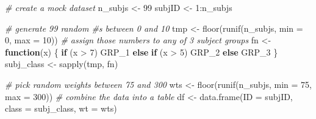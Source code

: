 \documentclass[smallextended]{svjour3}       %
\newenvironment{Shaded}{\begin{snugshade}}{\end{snugshade}}
\newcommand{\AttributeTok}[1]{\textcolor[rgb]{0.77,0.63,0.00}{#1}}
\newcommand{\CommentTok}[1]{\textcolor[rgb]{0.56,0.35,0.01}{\textit{#1}}}
\newcommand{\ControlFlowTok}[1]{\textcolor[rgb]{0.13,0.29,0.53}{\textbf{#1}}}
\newcommand{\DecValTok}[1]{\textcolor[rgb]{0.00,0.00,0.81}{#1}}
\newcommand{\FunctionTok}[1]{\textcolor[rgb]{0.00,0.00,0.00}{#1}}
\newcommand{\NormalTok}[1]{#1}
\newcommand{\OtherTok}[1]{\textcolor[rgb]{0.56,0.35,0.01}{#1}}
\newcommand{\SpecialCharTok}[1]{\textcolor[rgb]{0.00,0.00,0.00}{#1}}
\newcommand{\StringTok}[1]{\textcolor[rgb]{0.31,0.60,0.02}{#1}}
\begin{document}
\begin{Shaded}
\begin{Highlighting}[]
\CommentTok{\# create a mock dataset}
\NormalTok{n\_subjs }\OtherTok{\textless{}{-}} \DecValTok{99}
\NormalTok{subjID }\OtherTok{\textless{}{-}} \DecValTok{1}\SpecialCharTok{:}\NormalTok{n\_subjs}

\CommentTok{\# generate 99 random \#s between 0 and 10}
\NormalTok{tmp }\OtherTok{\textless{}{-}} \FunctionTok{floor}\NormalTok{(}\FunctionTok{runif}\NormalTok{(n\_subjs, }\AttributeTok{min =} \DecValTok{0}\NormalTok{, }\AttributeTok{max =} \DecValTok{10}\NormalTok{))}
\CommentTok{\# assign those numbers to any of 3 subject groups}
\NormalTok{fn }\OtherTok{\textless{}{-}} \ControlFlowTok{function}\NormalTok{(x) \{ }
  \ControlFlowTok{if}\NormalTok{ (x }\SpecialCharTok{\textgreater{}} \DecValTok{7}\NormalTok{) }\StringTok{\textquotesingle{}GRP\_1\textquotesingle{}} 
  \ControlFlowTok{else} \ControlFlowTok{if}\NormalTok{ (x }\SpecialCharTok{\textgreater{}} \DecValTok{5}\NormalTok{) }\StringTok{\textquotesingle{}GRP\_2\textquotesingle{}} 
  \ControlFlowTok{else} \StringTok{\textquotesingle{}GRP\_3\textquotesingle{}} 
\NormalTok{\}}
\NormalTok{subj\_class }\OtherTok{\textless{}{-}} \FunctionTok{sapply}\NormalTok{(tmp, fn)}

\CommentTok{\# pick random weights between 75 and 300}
\NormalTok{wts }\OtherTok{\textless{}{-}} \FunctionTok{floor}\NormalTok{(}\FunctionTok{runif}\NormalTok{(n\_subjs, }\AttributeTok{min =} \DecValTok{75}\NormalTok{, }\AttributeTok{max =} \DecValTok{300}\NormalTok{))}
\CommentTok{\# combine the data into a table}
\NormalTok{df }\OtherTok{\textless{}{-}} \FunctionTok{data.frame}\NormalTok{(}\AttributeTok{ID =}\NormalTok{ subjID, }\AttributeTok{class =}\NormalTok{ subj\_class, }\AttributeTok{wt =}\NormalTok{ wts)}


\end{Highlighting}
\end{Shaded}
\end{document}
